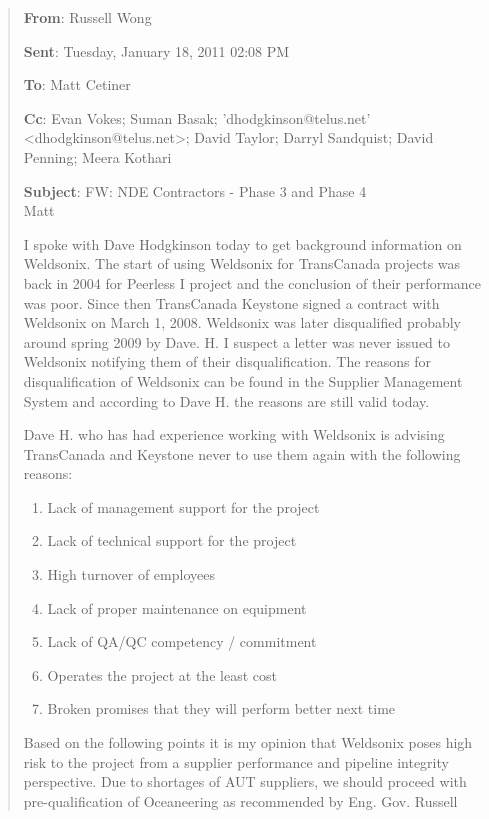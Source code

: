 \documentclass{article}
\begin{document}
	\begin{quote}
	
		\textbf{From}: Russell Wong

		\textbf{Sent}: Tuesday, January 18, 2011 02:08 PM

		\textbf{To}: Matt Cetiner

		\textbf{Cc}: Evan Vokes; Suman Basak; 'dhodgkinson@telus.net' \textless dhodgkinson@telus.net\textgreater ; David Taylor; Darryl Sandquist; David Penning; Meera Kothari

		\textbf{Subject}: FW: NDE Contractors - Phase 3 and Phase 4\\

		Matt

		I spoke with Dave Hodgkinson today to get background information on Weldsonix. The start of using Weldsonix for TransCanada projects was back in 2004 for Peerless I project and the conclusion of their performance was poor. Since then TransCanada Keystone signed a contract with Weldsonix on March 1, 2008. Weldsonix was later disqualified probably around spring 2009 by Dave. H. I suspect a letter was never issued to Weldsonix notifying them of their disqualification. The reasons for disqualification of Weldsonix can be found in the Supplier Management System and according to Dave H. the reasons are still valid today.

		Dave H. who has had experience working with Weldsonix is advising TransCanada and Keystone never to use them again with the following reasons: 

		\begin{enumerate}
			\item Lack of management support for the project 
			\item Lack of technical support for the project
			\item High turnover of employees
			\item Lack of proper maintenance on equipment 
			\item Lack of QA/QC competency / commitment
			\item Operates the project at the least cost 
			\item Broken promises that they will perform better next time

		\end{enumerate}

		Based on the following points it is my opinion that Weldsonix poses high risk to the project from a supplier performance and pipeline integrity perspective. Due to shortages of AUT suppliers, we should proceed with pre-qualification of Oceaneering as recommended by Eng. Gov. Russell 


\end{quote}
\end{document}
